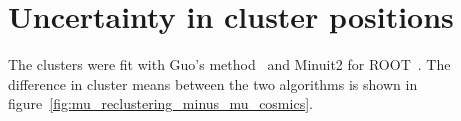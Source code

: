 

\chapter[Cluster position uncertainty]{Uncertainty in cluster positions}
\label{appendix:clustering}





The clusters were fit with Guo's method~\cite{guo_simple_2011} and Minuit2 for ROOT~\cite{hatlo_developments_2005}. The difference in cluster means between the two algorithms is shown in figure~\ref{fig:mu_reclustering_minus_mu_cosmics}.

